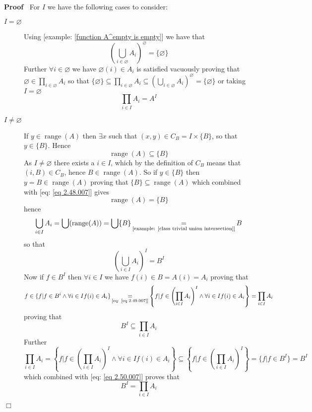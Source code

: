 \documentclass{book}
\newcommand{\equallim}{\mathop{=}\limits}
\newcommand{\tmop}[1]{\ensuremath{\operatorname{#1}}}
\newenvironment{proof}{\noindent\textbf{Proof\ }}{\hspace*{\fill}$\Box$\medskip}
\begin{document}
\begin{proof}
  For $I$ we have the following cases to consider:
  \begin{description}
    \item[$I = \varnothing$] Using [example: \ref{function A^empty is empty}]
    we have that
    \[ \left( \bigcup_{i \in \varnothing} A_i \right)^{\varnothing} = \{
       \varnothing \} \]
    Further $\forall i \in \varnothing$ we have $\varnothing (i) \in A_i$ is
    satisfied vacuously proving that $\varnothing \in \prod_{i \in
    \varnothing} A_i$ so that $\{ \varnothing \} \subseteq \prod_{i \in
    \varnothing} A_i \subseteq \left( \bigcup_{i \in \varnothing} A_i
    \right)^{\varnothing} = \{ \varnothing \}$ or taking $I = \varnothing$
    \[ \prod_{i \in I} A_i = A^I \]
    \item[$I \neq \varnothing$] If $y \in \tmop{range} (A)$ then $\exists x$
    such that $(x, y) \in C_B = I \times \{ B \}$, so that $y \in \{ B \}$.
    Hence
    \begin{equation}
      \label{eq 2.48.007} \tmop{range} (A) \subseteq \{ B \}
    \end{equation}
    As $I \neq \varnothing$ there exists a $i \in I$, which by the definition
    of $C_B$ means that $(i, B) \in C_B$, hence $B \in \tmop{range} (A)$. So
    if $y \in \{ B \}$ then $y = B \in \tmop{range} (A)$ proving that $\{ B \}
    \subseteq \tmop{range} (A)$ which combined with [eq: \ref{eq 2.48.007}]
    gives
    \[ \tmop{range} (A) = \{ B \} \]
    hence
    \[ \bigcup_{i \in I} A_i = \bigcup (\tmop{range} (A)) = \bigcup \{ B \}
       \equallim_{\text{[example: \ref{class trivial union intersection}]}} B
    \]
    so that
    \begin{equation}
      \label{eq 2.49.007} \left( \bigcup_{i \in I} A_i \right)^I = B^I
    \end{equation}
    Now if $f \in B^I$ then $\forall i \in I$ we have $f (i) \in B = A (i) =
    A_i$ proving that
    \[ f \in \{ f|f \in B^i \wedge \forall i \in I f (i) \in A_i \}
       \equallim_{\text{[eq: \ref{eq 2.49.007}]}} \left\{ f|f \in \left(
       \prod_{i \in I} A_i \right)^I \wedge \forall i \in I f (i) \in A_i
       \right\} = \prod_{i \in I} A_i \]
    proving that
    \begin{equation}
      \label{eq 2.50.007} B^I \subseteq \prod_{i \in I} A_i
    \end{equation}
    Further
    \[ \prod_{i \in I} A_i = \left\{ f|f \in \left( \prod_{i \in I} A_i
       \right)^I \wedge \forall i \in I f (i) \in A_i \right\} \subseteq
       \left\{ f|f \in \left( \prod_{i \in I} A_i \right)^I \right\} = \{ f|f
       \in B^I \} = B^I \]
    which combined with [eq: \ref{eq 2.50.007}] proves that
    \[ B^I = \prod_{i \in I} A_i \]
    
  \end{description}
\end{proof}
\end{document}
